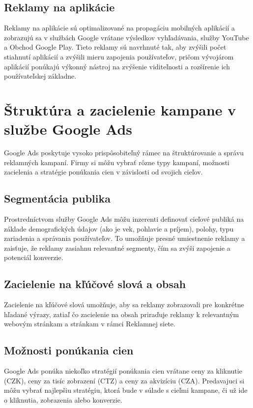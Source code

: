 \documentclass[10pt,slovak,a4paper]{article}
\begin{document}
\subsection{Reklamy na aplikácie}
Reklamy na aplikácie sú optimalizované na propagáciu mobilných
aplikácií a zobrazujú sa v službách Google vrátane výsledkov vyhľadávania, služby YouTube a Obchod Google Play. 
Tieto reklamy sú navrhnuté tak, aby zvýšili počet stiahnutí aplikácií a zvýšili mieru zapojenia používateľov, 
pričom vývojárom aplikácií ponúkajú výkonný nástroj na zvýšenie viditeľnosti a rozšírenie ich používateľskej základne.

\section{Štruktúra a zacielenie kampane v službe Google Ads}
Google Ads poskytuje vysoko prispôsobiteľný rámec na štruktúrovanie a správu reklamných kampaní. Firmy si môžu 
vybrať rôzne typy kampaní, možnosti zacielenia a stratégie ponúkania cien v závislosti od svojich cieľov.\cite{8847128}

\subsection{Segmentácia publika}
Prostredníctvom služby Google Ads môžu inzerenti definovať cieľové publiká na základe demografických údajov 
(ako je vek, pohlavie a príjem), polohy, typu zariadenia a správania používateľov. To umožňuje presné umiestnenie 
reklamy a zaisťuje, že reklamy zasiahnu relevantné segmenty, čím sa zvýši zapojenie a potenciál konverzie.

\subsection{Zacielenie na kľúčové slová a obsah}
Zacielenie na kľúčové slová umožňuje, aby sa reklamy zobrazovali pre konkrétne hľadané výrazy, zatiaľ čo zacielenie 
na obsah priraďuje reklamy k relevantným webovým stránkam a stránkam v rámci Reklamnej siete.\cite{7273289}

\subsection{Možnosti ponúkania cien}
Google Ads ponúka niekoľko stratégií ponúkania cien vrátane ceny za kliknutie (CZK), ceny za tisíc zobrazení (CTZ) a 
ceny za akvizíciu (CZA). Predavajuci si môžu vybrať najlepšiu stratégiu, ktorá bude v súlade s cieľmi kampane, či už ide 
o kliknutia, zobrazenia alebo konverzie.\cite{10574622}
\end{document}
